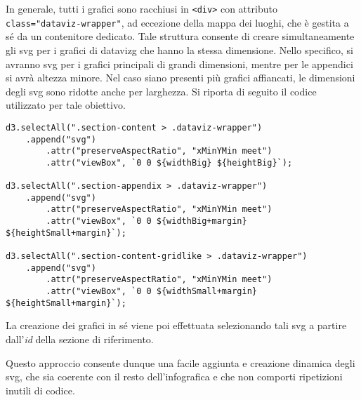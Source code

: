 In generale, tutti i grafici sono racchiusi in \texttt{<div>} con attributo \\ \texttt{class="dataviz-wrapper"}, ad eccezione della mappa dei luoghi, che è gestita a sé da un contenitore dedicato. 
Tale struttura consente di creare simultaneamente gli \gls{svg} per i grafici di \gls{datavizg} che hanno la stessa dimensione. 
Nello specifico, si avranno \gls{svg} per i grafici principali di grandi dimensioni, mentre per le appendici si avrà altezza minore. Nel caso siano presenti più grafici affiancati, le dimensioni degli \gls{svg} sono ridotte 
anche per larghezza.
Si riporta di seguito il codice utilizzato per tale obiettivo.
\begin{lstlisting}[style=std]
d3.selectAll(".section-content > .dataviz-wrapper")
    .append("svg")
        .attr("preserveAspectRatio", "xMinYMin meet")
        .attr("viewBox", `0 0 ${widthBig} ${heightBig}`);

d3.selectAll(".section-appendix > .dataviz-wrapper")
    .append("svg")
        .attr("preserveAspectRatio", "xMinYMin meet")
        .attr("viewBox", `0 0 ${widthBig+margin} ${heightSmall+margin}`);

d3.selectAll(".section-content-gridlike > .dataviz-wrapper")
    .append("svg")
        .attr("preserveAspectRatio", "xMinYMin meet")
        .attr("viewBox", `0 0 ${widthSmall+margin} ${heightSmall+margin}`);
\end{lstlisting}
La creazione dei grafici in sé viene poi effettuata selezionando tali \gls{svg} a partire dall'\emph{id} della sezione di riferimento. 

Questo approccio consente dunque una facile aggiunta e creazione dinamica degli \gls{svg}, che sia coerente con il resto dell'infografica
e che non comporti ripetizioni inutili di codice.

